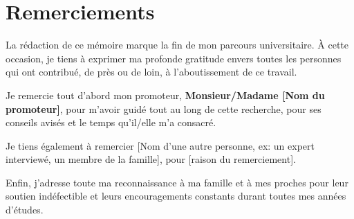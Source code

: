 
\chapter*{Remerciements}

La rédaction de ce mémoire marque la fin de mon parcours universitaire. À cette occasion, je tiens à exprimer ma profonde gratitude envers toutes les personnes qui ont contribué, de près ou de loin, à l'aboutissement de ce travail.

Je remercie tout d'abord mon promoteur, \textbf{Monsieur/Madame [Nom du promoteur]}, pour m'avoir guidé tout au long de cette recherche, pour ses conseils avisés et le temps qu'il/elle m'a consacré.

Je tiens également à remercier [Nom d'une autre personne, ex: un expert interviewé, un membre de la famille], pour [raison du remerciement].

Enfin, j'adresse toute ma reconnaissance à ma famille et à mes proches pour leur soutien indéfectible et leurs encouragements constants durant toutes mes années d'études.